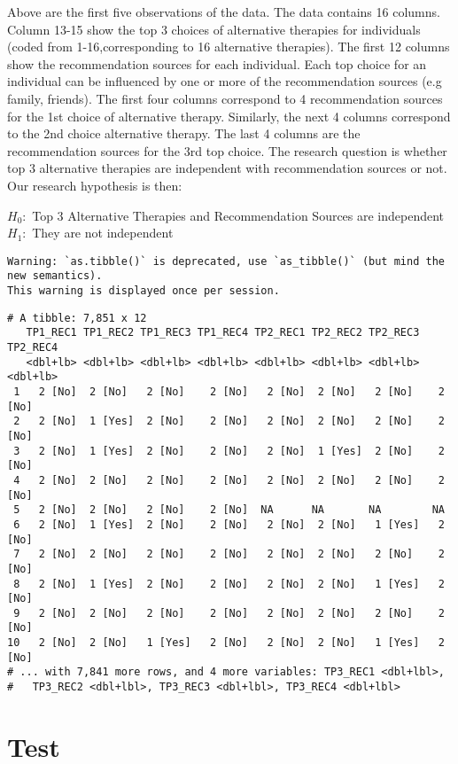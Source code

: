 \documentclass[]{article}
\begin{document}
Above are the first five observations of the data. The data contains 16
columns. Column 13-15 show the top 3 choices of alternative therapies
for individuals (coded from 1-16,corresponding to 16 alternative
therapies). The first 12 columns show the recommendation sources for
each individual. Each top choice for an individual can be influenced by
one or more of the recommendation sources (e.g family, friends). The
first four columns correspond to 4 recommendation sources for the 1st
choice of alternative therapy. Similarly, the next 4 columns correspond
to the 2nd choice alternative therapy. The last 4 columns are the
recommendation sources for the 3rd top choice. The research question is
whether top 3 alternative therapies are independent with recommendation
sources or not. Our research hypothesis is then:

\(H_{0}:\) Top 3 Alternative Therapies and Recommendation Sources are
independent \(H_{1}:\) They are not independent

\begin{verbatim}
Warning: `as.tibble()` is deprecated, use `as_tibble()` (but mind the new semantics).
This warning is displayed once per session.
\end{verbatim}

\begin{verbatim}
# A tibble: 7,851 x 12
   TP1_REC1 TP1_REC2 TP1_REC3 TP1_REC4 TP2_REC1 TP2_REC2 TP2_REC3 TP2_REC4
   <dbl+lb> <dbl+lb> <dbl+lb> <dbl+lb> <dbl+lb> <dbl+lb> <dbl+lb> <dbl+lb>
 1   2 [No]  2 [No]   2 [No]    2 [No]   2 [No]  2 [No]   2 [No]    2 [No]
 2   2 [No]  1 [Yes]  2 [No]    2 [No]   2 [No]  2 [No]   2 [No]    2 [No]
 3   2 [No]  1 [Yes]  2 [No]    2 [No]   2 [No]  1 [Yes]  2 [No]    2 [No]
 4   2 [No]  2 [No]   2 [No]    2 [No]   2 [No]  2 [No]   2 [No]    2 [No]
 5   2 [No]  2 [No]   2 [No]    2 [No]  NA      NA       NA        NA     
 6   2 [No]  1 [Yes]  2 [No]    2 [No]   2 [No]  2 [No]   1 [Yes]   2 [No]
 7   2 [No]  2 [No]   2 [No]    2 [No]   2 [No]  2 [No]   2 [No]    2 [No]
 8   2 [No]  1 [Yes]  2 [No]    2 [No]   2 [No]  2 [No]   1 [Yes]   2 [No]
 9   2 [No]  2 [No]   2 [No]    2 [No]   2 [No]  2 [No]   2 [No]    2 [No]
10   2 [No]  2 [No]   1 [Yes]   2 [No]   2 [No]  2 [No]   1 [Yes]   2 [No]
# ... with 7,841 more rows, and 4 more variables: TP3_REC1 <dbl+lbl>,
#   TP3_REC2 <dbl+lbl>, TP3_REC3 <dbl+lbl>, TP3_REC4 <dbl+lbl>
\end{verbatim}

\hypertarget{test}{%
\section{Test}\label{test}}
\end{document}
